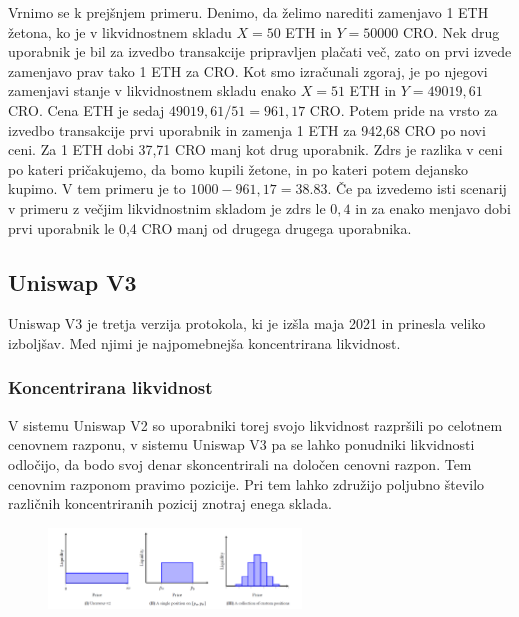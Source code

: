 \documentclass[a4paper,12pt]{article}%
\begin{document}
Vrnimo se k prejšnjem primeru. Denimo, da želimo narediti zamenjavo 1 ETH žetona, ko je v likvidnostnem skladu $X = 50$ ETH in $Y = 50 000$ CRO. Nek drug uporabnik je bil za izvedbo transakcije pripravljen plačati več, zato on prvi izvede zamenjavo prav tako 1 ETH za CRO. Kot smo izračunali zgoraj, je po njegovi zamenjavi stanje v likvidnostnem skladu enako $X = 51$ ETH in $Y = 49019,61$ CRO. Cena ETH je sedaj $49019,61/51 = 961,17$ CRO. Potem pride na vrsto za izvedbo transakcije prvi uporabnik in zamenja 1 ETH za 942,68 CRO po novi ceni. Za 1 ETH dobi 37,71 CRO manj kot drug uporabnik.
Zdrs je razlika v ceni po kateri pričakujemo, da bomo kupili žetone, in po kateri potem dejansko kupimo. V tem primeru je to $1000 - 961,17 = 38.83$. 
Če pa izvedemo isti scenarij v primeru z večjim likvidnostnim skladom je zdrs le $0,4$ in za enako menjavo dobi prvi uporabnik le 0,4 CRO manj od drugega drugega uporabnika.

\subsection{Uniswap V3}

Uniswap V3 je tretja verzija protokola, ki je izšla maja 2021 in prinesla veliko izboljšav. Med njimi je najpomebnejša koncentrirana likvidnost. 

\subsubsection{Koncentrirana likvidnost}

V sistemu Uniswap V2 so uporabniki torej svojo likvidnost razpršili po celotnem cenovnem razponu, v sistemu Uniswap V3 pa se lahko ponudniki likvidnosti odločijo, da bodo svoj denar skoncentrirali na določen cenovni razpon. Tem cenovnim razponom pravimo pozicije. 
Pri tem lahko združijo poljubno število različnih koncentriranih pozicij znotraj enega sklada.

\begin{figure}[!ht]
    \centering
    \includegraphics[width=0.6\textwidth]{pozicije.png}
\end{figure}
\end{document}
